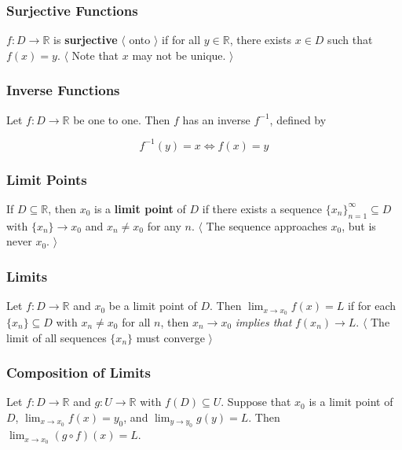 \documentclass[12pt,letterpaper]{article}
\newcommand{\R}{{\mathbb R}}
\newcommand{\btw}[1]{
    $\langle$ #1 $\rangle$
}
\begin{document}
\begin{multicols*}{2}
        \subsubsection{Surjective Functions}

        $f: D \rightarrow \R$ is {\bf surjective} \btw{onto} if for all $y \in
        \R$, there exists $x \in D$ such that $f(x) = y$. \btw{Note that $x$ may
        not be unique.}

        \subsubsection{Inverse Functions}

        Let $f: D \rightarrow \R$ be one to one. Then $f$ has an inverse
        $f^{-1}$, defined by

        \[
          f^{-1}(y) = x \Leftrightarrow f(x) = y
        \]

        \subsubsection{Limit Points}

        If $D \subseteq \R$, then $x_0$ is a {\bf limit point} of $D$ if there
        exists a sequence $\{x_n\}_{n = 1}^{\infty} \subseteq D$ with $\{x_n\}
        \rightarrow x_0$ and $x_n \ne x_0$ for any $n$. \btw{The sequence
        approaches $x_0$, but is never $x_0$. }

        \subsubsection{Limits}

        Let $f: D \rightarrow \R$ and $x_0$ be a limit point of $D$. Then
        $\lim_{x \to x_0} f(x) = L$ if for each $\{x_n\} \subseteq D$ with $x_n
        \ne x_0$ for all $n$, then $x_n \rightarrow x_0$ {\it implies that}
        $f(x_n) \rightarrow L$. \btw{ The limit of all sequences $\{x_n\}$ must
        converge}

        \subsubsection{Composition of Limits}

        Let $f: D \rightarrow \R$ and $g: U \rightarrow \R$ with $f(D) \subseteq
        U$. Suppose that $x_0$ is a limit point of $D$, $\lim_{x \to x_0}
        f(x) = y_0$, and $\lim_{y \to y_0} g(y) = L$. Then $\lim_{x \to x_0}(g
        \circ f)(x) = L$.


\end{multicols*}
\end{document}

